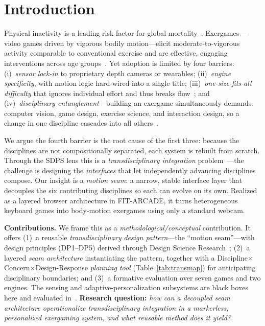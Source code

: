 \documentclass[runningheads]{llncs}
\newcommand{\sys}{\textsc{FIT-ARCADE}}
\newcommand{\citecompanion}{\cite{companion2026}}
\begin{document}
\section{Introduction}\label{sec:intro}
Physical inactivity is a leading risk factor for global mortality~\cite{who2022inactivity}.
Exergames---video games driven by vigorous bodily motion---elicit moderate-to-vigorous
activity comparable to conventional exercise and are effective, engaging
interventions across age groups~\cite{chen2023exergames}. Yet adoption is limited by
four barriers: (i)~\emph{sensor lock-in} to proprietary depth cameras or wearables;
(ii)~\emph{engine specificity}, with motion logic hard-wired into a single title;
(iii)~\emph{one-size-fits-all difficulty} that ignores individual effort and thus
breaks flow~\cite{csikszentmihalyi1990flow}; and (iv)~\emph{disciplinary
entanglement}---building an exergame simultaneously demands computer vision, game
design, exercise science, and interaction design, so a change in one discipline
cascades into all others~\cite{sinclair2007considerations}.

We argue the fourth barrier is the root cause of the first three: because the
disciplines are not compositionally separated, each system is rebuilt from scratch.
Through the SDPS lens this is a \emph{transdisciplinary integration}
problem~\cite{nicolescu2002manifesto,ertas2010transdisciplinary}---the challenge is
designing the \emph{interfaces} that let independently advancing disciplines compose.
Our insight is a \emph{motion seam}: a narrow, stable interface layer that decouples
the six contributing disciplines so each can evolve on its own. Realized as a layered
browser architecture in \sys{}, it turns heterogeneous keyboard games into
body-motion exergames using only a standard webcam.

\noindent\textbf{Contributions.} We frame this as a \emph{methodological/conceptual}
contribution. It offers (1)~a reusable \emph{transdisciplinary design pattern}---the
``motion seam''---with design principles (DP1--DP5) derived through Design Science
Research~\cite{hevner2004dsr}; (2)~a layered \emph{seam architecture} instantiating the
pattern, together with a Discipline$\times$Concern$\times$Design-Response \emph{planning
tool} (Table~\ref{tab:transmap}) for anticipating disciplinary boundaries; and (3)~a
formative evaluation over seven games and two engines. The sensing and
adaptive-personalization subsystems are black boxes here and evaluated
in~\citecompanion{}. \textbf{Research question:} \emph{how can a decoupled seam
architecture operationalize transdisciplinary integration in a markerless,
personalized exergaming system, and what reusable method does it yield?}
\end{document}
